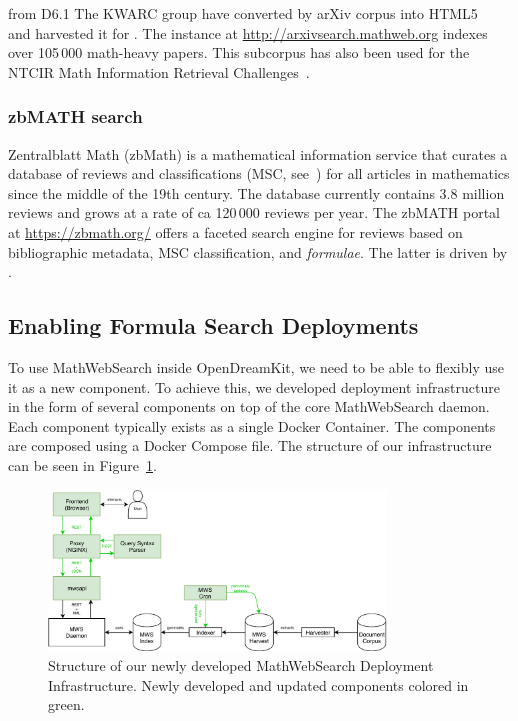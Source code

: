 \begin{newpart}{from D6.1}
The KWARC group have converted by arXiv corpus into HTML5~\cite{StaKoh:tlcspx10} and
harvested it for \MWS. The instance at \url{http://arxivsearch.mathweb.org}
indexes over 105\,000 math-heavy papers. This subcorpus has also been used for the NTCIR
Math Information Retrieval
Challenges~\cite{AizKohOun:nmpto13,AizKohOunSch:nmto14,AizKohOunSch:nmto16}.

\subsubsection{zbMATH search}

Zentralblatt Math (zbMath) is a mathematical information service that curates a database of reviews and classifications (MSC, see~\cite{MSC2010}) for all articles in mathematics since the middle of the 19th century. The database currently contains 3.8 million reviews and grows at a rate of ca 120\,000 reviews per year.
The zbMATH portal at \url{https://zbmath.org/} offers a faceted search engine for reviews based on bibliographic metadata, MSC classification, and \emph{formulae}.
The latter is driven by \MWS. 

\end{newpart}

\subsection{Enabling Formula Search Deployments}\label{sec:software:deployment}

To use MathWebSearch inside OpenDreamKit, we need to be able to flexibly use it as a new component. 
To achieve this, we developed deployment infrastructure in the form of several components on top of the core MathWebSearch daemon. 
Each component typically exists as a single Docker Container. 
The components are composed using a Docker Compose file.
The structure of our infrastructure can be seen in Figure~\ref{fig:mwsdeployment}. 

\begin{figure}[ht]
  \includegraphics[width=0.8\textwidth]{mws_layout.pdf}
  \caption{Structure of our newly developed MathWebSearch Deployment Infrastructure. Newly developed and updated components colored in green. }\label{fig:mwsdeployment}
\end{figure}


